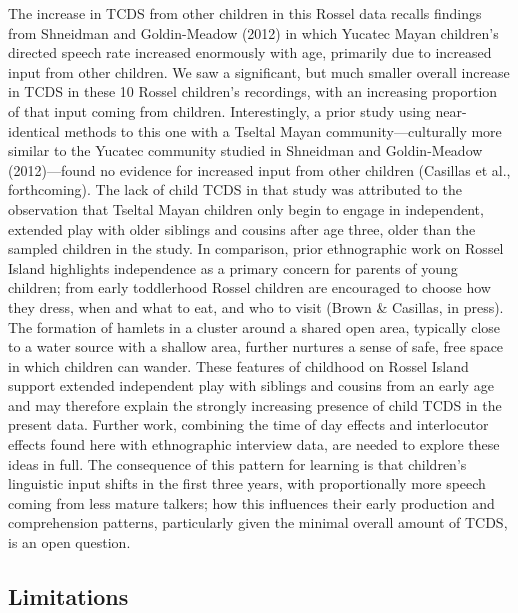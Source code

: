 \documentclass[,man,floatsintext]{apa6}
\begin{document}
The increase in TCDS from other children in this Rossel data recalls
findings from Shneidman and Goldin-Meadow (2012) in which Yucatec Mayan
children's directed speech rate increased enormously with age, primarily
due to increased input from other children. We saw a significant, but
much smaller overall increase in TCDS in these 10 Rossel children's
recordings, with an increasing proportion of that input coming from
children. Interestingly, a prior study using near-identical methods to
this one with a Tseltal Mayan community---culturally more similar to the
Yucatec community studied in Shneidman and Goldin-Meadow (2012)---found
no evidence for increased input from other children (Casillas et al.,
forthcoming). The lack of child TCDS in that study was attributed to the
observation that Tseltal Mayan children only begin to engage in
independent, extended play with older siblings and cousins after age
three, older than the sampled children in the study. In comparison,
prior ethnographic work on Rossel Island highlights independence as a
primary concern for parents of young children; from early toddlerhood
Rossel children are encouraged to choose how they dress, when and what
to eat, and who to visit (Brown \& Casillas, in press). The formation of
hamlets in a cluster around a shared open area, typically close to a
water source with a shallow area, further nurtures a sense of safe, free
space in which children can wander. These features of childhood on
Rossel Island support extended independent play with siblings and
cousins from an early age and may therefore explain the strongly
increasing presence of child TCDS in the present data. Further work,
combining the time of day effects and interlocutor effects found here
with ethnographic interview data, are needed to explore these ideas in
full. The consequence of this pattern for learning is that children's
linguistic input shifts in the first three years, with proportionally
more speech coming from less mature talkers; how this influences their
early production and comprehension patterns, particularly given the
minimal overall amount of TCDS, is an open question.

\subsection{Limitations}\label{limitations}
\end{document}
